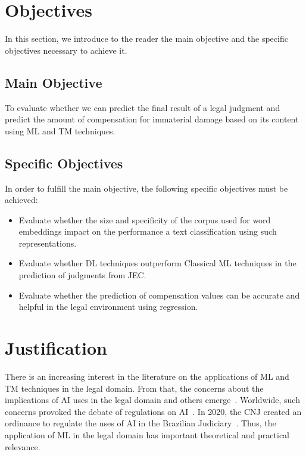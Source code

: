 \section{Objectives}

In this section, we introduce to the reader the main objective and the specific objectives necessary to achieve it.

\subsection{Main Objective}

To evaluate whether we can predict the final result of a legal judgment  and predict the amount of compensation for immaterial damage based on its content using \gls{ML} and \gls{TM} techniques.

\subsection{Specific Objectives}

In order to fulfill the main objective, the following specific objectives must be achieved:

\begin{itemize}[noitemsep]
    \item Evaluate whether the size and specificity of the corpus used for word embeddings impact on the performance a text classification using such representations.
    \item Evaluate whether \gls{DL} techniques outperform Classical \gls{ML} techniques in the prediction of judgments from \gls{JEC}.
    \item Evaluate whether the prediction of compensation values can be accurate and helpful in the legal environment using regression.
\end{itemize}

\section{Justification}

There is an increasing interest in the literature on the applications of \gls{ML} and \gls{TM} techniques in the legal domain. From that, the concerns about the implications of \gls{AI} uses in the legal domain and others emerge~\cite{Braz2018, Davis2020}. Worldwide, such concerns provoked the debate of regulations on \gls{AI}~\cite{Cath2018}. In 2020, the \gls{CNJ} created an ordinance to regulate the uses of \gls{AI} in the Brazilian Judiciary~\cite{CNJ2020b}. Thus, the application of \gls{ML} in the legal domain has important theoretical and practical relevance.

